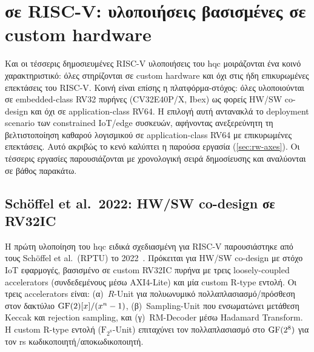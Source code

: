 \begin{table}[htbp]
  \centering
  \caption[Σύγκριση σχετικών εργασιών]{Ενοποιημένη σύγκριση σχετικών εργασιών κατά τους άξονες της
  \cref{sec:rw-axes}. Στήλες: πλατφόρμα, μέθοδος πολυωνυμικού πολλαπλασιασμού,
  στρατηγική επιτάχυνσης, και τρία δυαδικά κριτήρια:  (αρχιτεκτονική
  στόχευσης),  (χωρίς custom hardware ) και 
  . / δηλώνουν
  ικανοποίηση/μη ικανοποίηση.  δηλώνει μη εφαρμοσιμότητα.}
  \label{tab:rw-riscv-summary}
  \footnotesize
  \setlength{\tabcolsep}{3pt}
  \resizebox{\textwidth}{!}{%
  }
\end{table}

\section{\HQC σε RISC-V: υλοποιήσεις βασισμένες σε custom hardware}
\label{sec:rw-riscv}

Και οι τέσσερις δημοσιευμένες RISC-V υλοποιήσεις του \gls{hqc} μοιράζονται ένα κοινό
χαρακτηριστικό: όλες στηρίζονται σε custom hardware και όχι στις ήδη επικυρωμένες
επεκτάσεις του RISC-V.
Κοινή είναι επίσης η πλατφόρμα-στόχος: όλες υλοποιούνται σε embedded-class RV32
πυρήνες (CV32E40P/X, Ibex) ως φορείς HW/SW co-design και όχι σε application-class
RV64. Η επιλογή αυτή αντανακλά το deployment scenario των constrained IoT/edge
συσκευών, αφήνοντας ανεξερεύνητη τη βελτιστοποίηση καθαρού λογισμικού σε
application-class RV64 με επικυρωμένες επεκτάσεις.
Αυτό ακριβώς το κενό καλύπτει η παρούσα εργασία (\cref{sec:rw-axes}). Οι τέσσερις εργασίες
παρουσιάζονται με χρονολογική σειρά δημοσίευσης και αναλύονται σε βάθος παρακάτω.

\subsection{Schöffel et al.\ 2022: HW/SW co-design σε RV32IC}
\label{ssec:rw-schoeffel}

Η πρώτη υλοποίηση του \gls{hqc} ειδικά σχεδιασμένη για RISC-V παρουσιάστηκε από τους
Schöffel et al.\ (RPTU) το
2022~\cite{Schoeffel2022-HQC-IoT}. Πρόκειται για HW/SW co-design με στόχο IoT εφαρμογές, βασισμένο σε
custom RV32IC πυρήνα με τρεις loosely-coupled accelerators (συνδεδεμένους
μέσω AXI4-Lite) και μία custom R-type εντολή. Οι τρεις accelerators είναι:
(α)~$R$-Unit για πολυωνυμικό πολλαπλασιασμό/πρόσθεση στον δακτύλιο
$\mathrm{GF}(2)[x]/(x^n-1)$, (β)~Sampling-Unit που ενσωματώνει μετάθεση Keccak και
rejection sampling, και (γ)~RM-Decoder μέσω Hadamard Transform. Η custom
R-type εντολή ($\mathrm{F}_{2^8}$-Unit) επιταχύνει τον πολλαπλασιασμό στο
$\mathrm{GF}(2^8)$ για τον \gls{rs} κωδικοποιητή/αποκωδικοποιητή.

